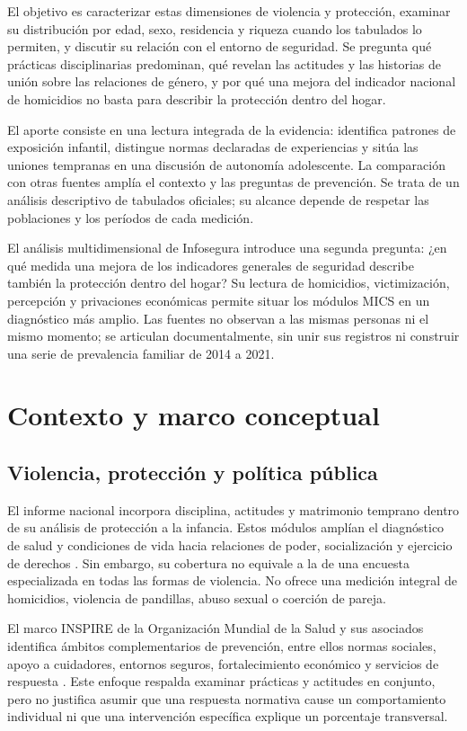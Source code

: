 \documentclass[11pt,a4paper]{article}
\begin{document}
El objetivo es caracterizar estas dimensiones de violencia y protección,
examinar su distribución por edad, sexo, residencia y riqueza cuando los
tabulados lo permiten, y discutir su relación con el entorno de seguridad.
Se pregunta qué prácticas disciplinarias predominan, qué revelan las
actitudes y las historias de unión sobre las relaciones de género, y por
qué una mejora del indicador nacional de homicidios no basta para describir
la protección dentro del hogar.

El aporte consiste en una lectura integrada de la evidencia: identifica
patrones de exposición infantil, distingue normas declaradas de experiencias
y sitúa las uniones tempranas en una discusión de autonomía adolescente.
La comparación con otras fuentes amplía el contexto y las preguntas de
prevención. Se trata de un análisis descriptivo de tabulados oficiales;
su alcance depende de respetar las poblaciones y los períodos de cada medición.

El análisis multidimensional de Infosegura \citep{infosegura2021} introduce una segunda
pregunta: ¿en qué medida una mejora de los indicadores generales de seguridad
describe también la protección dentro del hogar? Su lectura de homicidios,
victimización, percepción y privaciones económicas permite situar los módulos
MICS en un diagnóstico más amplio. Las fuentes no observan a las mismas
personas ni el mismo momento; se articulan documentalmente, sin unir sus
registros ni construir una serie de prevalencia familiar de 2014 a 2021.

\section{Contexto y marco conceptual}
\subsection{Violencia, protección y política pública}
El informe nacional incorpora disciplina, actitudes y matrimonio temprano
dentro de su análisis de protección a la infancia. Estos módulos amplían el
diagnóstico de salud y condiciones de vida hacia relaciones de poder,
socialización y ejercicio de derechos \citep{ens}. Sin embargo, su cobertura no
equivale a la de una encuesta especializada en todas las formas de violencia.
No ofrece una medición integral de homicidios, violencia de pandillas, abuso
sexual o coerción de pareja.

El marco INSPIRE de la Organización Mundial de la Salud y sus asociados
identifica ámbitos complementarios de prevención, entre ellos normas sociales,
apoyo a cuidadores, entornos seguros, fortalecimiento económico y servicios de
respuesta \citep{inspire}. Este enfoque respalda examinar prácticas y actitudes
en conjunto, pero no justifica asumir que una respuesta normativa cause un
comportamiento individual ni que una intervención específica explique un
porcentaje transversal.
\end{document}
